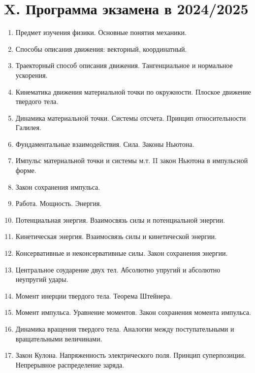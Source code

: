 \documentclass[12pt]{article}
\begin{document}


    \clearpage

    \section{X. Программа экзамена в 2024/2025}

    \begin{enumerate}
        \item Предмет изучения физики. Основные понятия механики.  
        \item Способы описания движения: векторный, координатный.  
        \item Траекторный способ описания движения. Тангенциальное и нормальное ускорения. 
        \item Кинематика движения материальной точки по окружности. Плоское движение твердого 
        тела.  
        \item Динамика материальной точки. Системы отсчета. Принцип относительности Галилея. 
        \item Фундаментальные взаимодействия. Сила. Законы Ньютона. 
        \item Импульс материальной точки и системы м.т. II закон Ньютона в импульсной форме.  
        \item Закон сохранения импульса. 
        \item Работа. Мощность. Энергия.  
        \item Потенциальная энергия. Взаимосвязь силы и потенциальной энергии. 
        \item Кинетическая энергия. Взаимосвязь силы и кинетической энергии. 
        \item Консервативные и неконсервативные силы. Закон сохранения энергии.  
        \item Центральное соударение двух тел. Абсолютно упругий и абсолютно неупругий удары.  
        \item Момент инерции твердого тела. Теорема Штейнера. 
        \item Момент импульса. Уравнение моментов. Закон сохранения момента импульса.  
        \item Динамика вращения твердого тела. Аналогии между поступательными и вращательными 
        величинами. 
        \item Закон Кулона. Напряженность электрического поля. Принцип суперпозиции. 
        Непрерывное распределение заряда.  

\end{enumerate}
\end{document}
